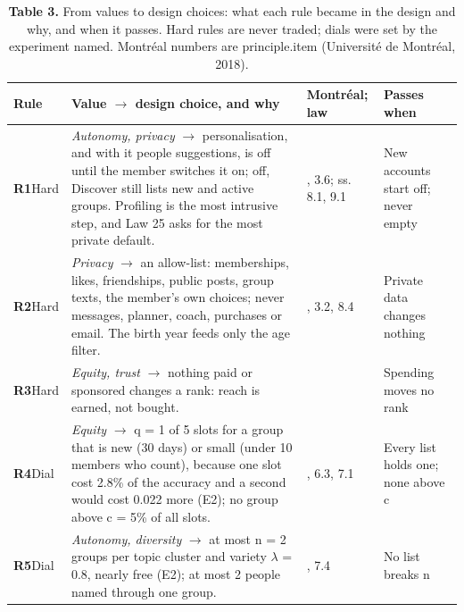 \documentclass[11pt,letterpaper]{article}
\newcommand{\rowrule}{\midrule[0.2pt]}
\begin{document}
\begin{table}[!htbp]
\centering
\caption*{\textbf{Table 3.} From values to design choices: what each rule became in the design and why, and
when it passes. Hard rules are never traded; dials were set by the experiment named. Montréal numbers are
principle.item (Université de Montréal, 2018).}
\scriptsize
\begin{tabular}{
  >{\raggedright\arraybackslash}p{}
  >{\raggedright\arraybackslash}p{}
  >{\raggedright\arraybackslash}p{}
  >{\raggedright\arraybackslash}p{}
}
\toprule
\textbf{Rule} & \textbf{Value $\rightarrow$ design choice, and why} & \textbf{Montréal; law} & \textbf{Passes when} \\
\midrule
\textbf{R1}\mbox{}\newline Hard & \textit{Autonomy, privacy} $\rightarrow$ personalisation, and with it people suggestions, is off until the member switches it on; off, Discover still lists new and active groups. Profiling is the most intrusive step, and Law 25 asks for the most private default. & 3.4, 3.6; ss. 8.1, 9.1 & New accounts start off; never empty \\
\rowrule
\textbf{R2}\mbox{}\newline Hard & \textit{Privacy} $\rightarrow$ an allow-list: memberships, likes, friendships, public posts, group texts, the member's own choices; never messages, planner, coach, purchases or email. The birth year feeds only the age filter. & 3.1, 3.2, 8.4 & Private data changes nothing \\
\rowrule
\textbf{R3}\mbox{}\newline Hard & \textit{Equity, trust} $\rightarrow$ nothing paid or sponsored changes a rank: reach is earned, not bought. & 6.2 & Spending moves no rank \\
\rowrule
\textbf{R4}\mbox{}\newline Dial & \textit{Equity} $\rightarrow$ q = 1 of 5 slots for a group that is new (30 days) or small (under 10 members who count), because one slot cost 2.8\% of the accuracy and a second would cost 0.022 more (E2); no group above c = 5\% of all slots. & 6.2, 6.3, 7.1 & Every list holds one; none above c \\
\rowrule
\textbf{R5}\mbox{}\newline Dial & \textit{Autonomy, diversity} $\rightarrow$ at most n = 2 groups per topic cluster and variety $\lambda$ = 0.8, nearly free (E2); at most 2 people named through one group. & 7.1, 7.4 & No list breaks n \\

\end{tabular}
\end{table}
\end{document}
